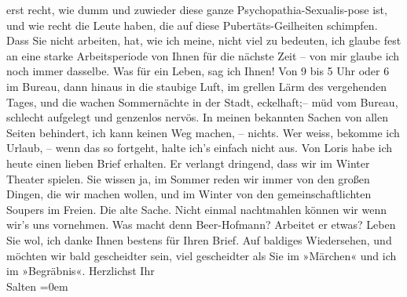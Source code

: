 \begin{ledgroupsized}[t]{13cm}
               erst recht, wie dumm und zuwieder diese ganze Psychopathia-Sexualis-pose ist, und wie recht die Leute haben, die auf diese
               Pubertäts-Geilheiten schimpfen.\pend
           \pstart
           Dass Sie nicht arbeiten, hat, wie ich meine, nicht viel zu bedeuten, ich glaube fest
               an eine starke Arbeitsperiode von Ihnen für die nächste Zeit – von mir glaube ich
               noch immer dasselbe.\pend
           \pstart
           Was für ein Leben, sag ich Ihnen! Von 9 bis 5 Uhr oder 6 im Bureau, dann hinaus in
               die staubige Luft, im grellen Lärm des vergehenden Tages, und die wachen Sommernächte
               in der Stadt, eckelhaft;– müd vom Bureau, schlecht aufgelegt und genzenlos
               nervös.\pend
           \pstart
           In meinen bekannten Sachen von {\pb}allen Seiten behindert,
               ich kann keinen Weg machen, – nichts. Wer weiss, bekomme ich Urlaub, – wenn das so
               fortgeht, halte ich’s einfach nicht aus.\pend
           \pstart
           Von Loris habe ich heute einen lieben Brief
               erhalten. Er verlangt dringend, dass wir im Winter Theater spielen. Sie wissen ja, im
               Sommer reden wir immer von den großen Dingen, die wir machen wollen, und im Winter
               von den gemeinschaftlichten Soupers im Freien. Die alte Sache. Nicht einmal
               nachtmahlen können wir wenn wir’s uns vornehmen. Was macht denn Beer-Hofmann? Arbeitet er etwas? \pend
           \pstart
           Leben Sie wol, ich danke Ihnen bestens für Ihren Brief. Auf baldiges Wiedersehen, und
               möchten wir bald gescheidter sein, viel gescheidter als Sie im »Märchen« und ich im »Begräbnis«.\pend
           \pstart
           Herzlichst Ihr{\\[\baselineskip]}\spacefill\mbox{Salten}\pend
           \leftskip=0em{}
         
         \endnumbering{}\end{ledgroupsized}\begin{anhang}\end{anhang}\newcommand{\dateiname}{L03123}\newcommand{\titel}{Felix Salten an Arthur Schnitzler, 6. 7. 1893}\newcommand{\editorInnen}{Martin Anton Müller und Laura Untner}
      